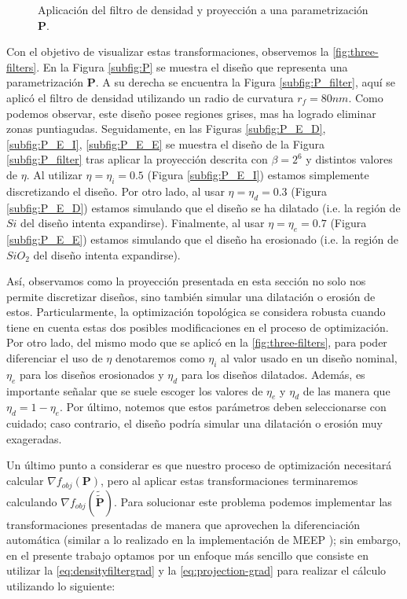 \begin{figure}[ht]
  \caption{Aplicación del filtro de densidad y proyección a una parametrización $\boldsymbol{P}.$}
  \label{fig:three-filters}
\end{figure}

Con el objetivo de visualizar estas transformaciones, observemos la \autoref{fig:three-filters}.
En la Figura \autoref{subfig:P} se muestra el diseño que representa una parametrización $\boldsymbol{P}$.
A su derecha se encuentra la Figura \autoref{subfig:P_filter}, aquí se aplicó el filtro de densidad
utilizando un radio de curvatura $r_f = 80 nm$. Como podemos observar, este diseño posee regiones grises,
mas ha logrado eliminar zonas puntiagudas.
Seguidamente, en las Figuras \autoref{subfig:P_E_D}, \autoref{subfig:P_E_I}, \autoref{subfig:P_E_E}
se muestra el diseño de la Figura \autoref{subfig:P_filter} tras aplicar la proyección descrita con
$\beta = 2^6$ y distintos valores de $\eta$.
Al utilizar $\eta = \eta_i = 0.5$ (Figura \autoref{subfig:P_E_I}) 
estamos simplemente discretizando el diseño.
Por otro lado, al usar $\eta = \eta_d = 0.3$ (Figura \autoref{subfig:P_E_D})
estamos simulando que el diseño se ha dilatado 
(i.e. la región de $Si$ del diseño intenta expandirse).
Finalmente, al usar $\eta = \eta_e = 0.7$ (Figura \autoref{subfig:P_E_E})
estamos simulando que el diseño ha erosionado 
(i.e. la región de $SiO_2$ del diseño intenta expandirse).


Así, observamos como la proyección presentada en esta sección no solo nos permite discretizar diseños,
sino también simular una dilatación o erosión de estos.
Particularmente, la optimización topológica se considera robusta cuando
tiene en cuenta estas dos posibles modificaciones en el proceso de optimización.
Por otro lado, del mismo modo que se aplicó en la \autoref{fig:three-filters}, para poder diferenciar 
el uso de $\eta$ denotaremos como $\eta_i$ al valor usado en un diseño nominal, 
$\eta_e$ para los diseños erosionados y $\eta_d$ para los diseños dilatados.
Además, es importante señalar que se suele escoger los valores de $\eta_e$ y $\eta_d$
de las manera que $\eta_d = 1 - \eta_e$.
Por último, notemos que  estos parámetros deben seleccionarse con cuidado; 
caso contrario, el diseño podría simular una dilatación o erosión muy exageradas.

Un último punto a considerar es que nuestro proceso de optimización necesitará calcular 
$\nabla f_{obj}(\boldsymbol{P})$, pero al aplicar estas transformaciones terminaremos calculando
$\nabla f_{obj}(\widetilde{\widetilde{\boldsymbol{P}}})$.
Para solucionar este problema podemos implementar las transformaciones presentadas 
de manera que aprovechen la diferenciación automática (similar a lo realizado en la implementación
de MEEP \citep{Oskooi2010}); sin embargo, en el presente trabajo optamos por un enfoque más sencillo
que consiste en utilizar la \autoref{eq:densityfiltergrad} y la \autoref{eq:projection-grad} 
para realizar el cálculo utilizando lo siguiente:

